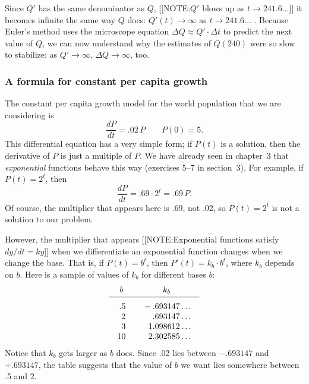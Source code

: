 Since $Q'$ has the same denominator as $Q$, 
	[[NOTE:$Q'$ blows up as $t \to 241.6\ldots$]]
it becomes infinite the same way $Q$ does: $Q'(t) \to \infty$ as $t \to 241.6\ldots$ .  Because Euler's method uses the microscope equation $\Delta Q \approx Q' \cdot \Delta t$ to predict the next value of $Q$, we can now understand why the estimates of $Q(240)$ were so slow to stabilize: as $Q' \to \infty$, $\Delta Q \to \infty$, too.


\subsubsection{A formula for constant per capita growth}
\label{subsubsec:a-formula-for-constant-per-capita-growth}

	The constant per capita growth model for the world population that we are considering is 
	\[
\dfrac{dP}{dt} = .02\, P \qquad P(0) = 5.
\]
This differential equation has a very simple form; if $P(t)$ is a solution, then the derivative of $P$ is just a multiple of $P$.  We have already seen in chapter~3 that {\em exponential\/} functions behave this way (exercises 5--7 in section~3).  For example, if $P(t) = 2^t$, then
	\[
\dfrac{dP}{dt} = .69 \cdot 2^t = .69 \, P.
\]
Of course, the multiplier that appears here is .69, not .02, so $P(t) = 2^t$ is not a solution to our problem.

	However, the multiplier that appears 
	[[NOTE:Exponential functions satisfy $dy/dt = ky$]]
when we differentiate an exponential function changes when we change the base.  That is, if $P(t) = b^t$, then $P'(t) = k_b \cdot b^t$, where $k_b$ depends on $b$.  Here is a sample of values of $k_b$ for different bases $b$:
	\addtolength{\arraycolsep}{4pt}
	\[
\begin{array}{cc}
	b & k_b \\[2pt] \hline
	\begin{array}{r}
	\rule{0pt}{14pt} .5 \\ 2 \\ 3 \\ 10 
	\end{array}
	&
	\begin{array}{r}
	\rule{0pt}{14pt} -.693147\ldots \\ .693147\ldots \\
		1.098612\ldots \\ 2.302585\ldots 
	\end{array}
	\end{array}
\]
	\addtolength{\arraycolsep}{-4pt}%
Notice that $k_b$ gets larger as $b$ does.  Since .02\label{k_b} lies
between $-.693147$ and $+.693147$, the table suggests that the value
of $b$ we want lies somewhere between .5 and 2.


